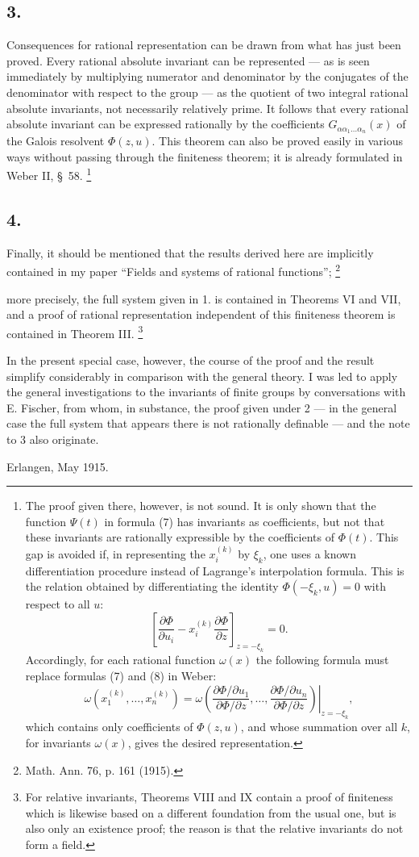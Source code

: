\documentclass[11pt]{article}
\providecommand{\NoetherSrcNote}[2]{%
  \begingroup
  \renewcommand{\thefootnote}{#1}%
  \footnote{#2}%
  \addtocounter{footnote}{-1}%
  \endgroup}
\begin{document}
\subsection*{3.}
Consequences for rational representation can be drawn from what has just been proved. Every rational absolute invariant can be represented --- as is seen immediately by multiplying numerator and denominator by the conjugates of the denominator with respect to the group --- as the quotient of two integral rational absolute invariants, not necessarily relatively prime. It follows that every rational absolute invariant can be expressed rationally by the coefficients $G_{\alpha\alpha_1\ldots\alpha_n}(x)$ of the Galois resolvent $\Phi(z,u)$. This theorem can also be proved easily in various ways without passing through the finiteness theorem; it is already formulated in Weber II, \S\ 58.\NoetherSrcNote{*)}{The proof given there, however, is not sound. It is only shown that the function $\Psi(t)$ in formula (7) has invariants as coefficients, but not that these invariants are rationally expressible by the coefficients of $\Phi(t)$. This gap is avoided if, in representing the $x_i^{(k)}$ by $\xi_k$, one uses a known differentiation procedure instead of Lagrange's interpolation formula. This is the relation obtained by differentiating the identity $\Phi(-\xi_k,u)=0$ with respect to all $u$:
\[
 \left[\frac{\partial\Phi}{\partial u_i}
      -x_i^{(k)}\frac{\partial\Phi}{\partial z}\right]_{z=-\xi_k}=0.
\]
Accordingly, for each rational function $\omega(x)$ the following formula must replace formulas (7) and (8) in Weber:
\[
 \omega(x_1^{(k)},\ldots,x_n^{(k)})=
 \left.
 \omega\!\left(
   \frac{\partial\Phi/\partial u_1}{\partial\Phi/\partial z},\ldots,
   \frac{\partial\Phi/\partial u_n}{\partial\Phi/\partial z}
 \right)\right|_{z=-\xi_k},
\]
which contains only coefficients of $\Phi(z,u)$, and whose summation over all $k$, for invariants $\omega(x)$, gives the desired representation.}

\subsection*{4.}
Finally, it should be mentioned that the results derived here are implicitly contained in my paper ``Fields and systems of rational functions'';\NoetherSrcNote{*)}{Math. Ann. 76, p. 161 (1915).} more precisely, the full system given in 1. is contained in Theorems VI and VII, and a proof of rational representation independent of this finiteness theorem is contained in Theorem III.\NoetherSrcNote{**)}{For relative invariants, Theorems VIII and IX contain a proof of finiteness which is likewise based on a different foundation from the usual one, but is also only an existence proof; the reason is that the relative invariants do not form a field.} In the present special case, however, the course of the proof and the result simplify considerably in comparison with the general theory. I was led to apply the general investigations to the invariants of finite groups by conversations with E. Fischer, from whom, in substance, the proof given under 2 --- in the general case the full system that appears there is not rationally definable --- and the note to 3 also originate.

Erlangen, May 1915.
\end{document}

